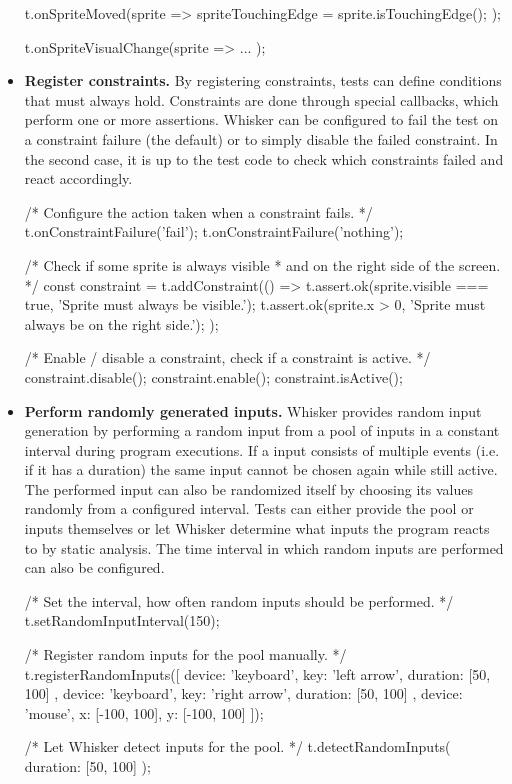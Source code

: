 \begin{itemize}
\begin{javascriptcode}
            t.onSpriteMoved(sprite => {
                spriteTouchingEdge = sprite.isTouchingEdge();
            });

            t.onSpriteVisualChange(sprite => { ... });
        \end{javascriptcode}
    \item \textbf{Register constraints.}
        By registering constraints, tests can define conditions that must always hold.
        Constraints are done through special callbacks, which perform one or more assertions.
        Whisker can be configured to fail the test on a constraint failure (the default) or to simply disable the failed constraint.
        In the second case, it is up to the test code to check which constraints failed and react accordingly.
        \begin{javascriptcode}
            /* Configure the action taken when a constraint fails. */
            t.onConstraintFailure('fail');
            t.onConstraintFailure('nothing');

            /* Check if some sprite is always visible
             * and on the right side of the screen. */
            const constraint = t.addConstraint(() => {
                t.assert.ok(sprite.visible === true, 'Sprite must always be visible.');
                t.assert.ok(sprite.x > 0, 'Sprite must always be on the right side.');
            });

            /* Enable / disable a constraint, check if a constraint is active. */
            constraint.disable();
            constraint.enable();
            constraint.isActive();
        \end{javascriptcode}
    \item \textbf{Perform randomly generated inputs.}
        Whisker provides random input generation by performing a random input from a pool of inputs in a constant interval during program executions.
        If a input consists of multiple events (i.e. if it has a duration) the same input cannot be chosen again while still active.
        The performed input can also be randomized itself by choosing its values randomly from a configured interval.
        Tests can either provide the pool or inputs themselves or let Whisker determine what inputs the program reacts to by static analysis.
        The time interval in which random inputs are performed can also be configured.
        \begin{javascriptcode}
            /* Set the interval, how often random inputs should be performed. */
            t.setRandomInputInterval(150);

            /* Register random inputs for the pool manually. */
            t.registerRandomInputs([
                  { device: 'keyboard', key: 'left arrow', duration: [50, 100] },
                  { device: 'keyboard', key: 'right arrow', duration: [50, 100] },
                  { device: 'mouse', x: [-100, 100], y: [-100, 100] }
            ]);

            /* Let Whisker detect inputs for the pool. */
            t.detectRandomInputs({ duration: [50, 100] });
        \end{javascriptcode}
\end{itemize}
\parspace

